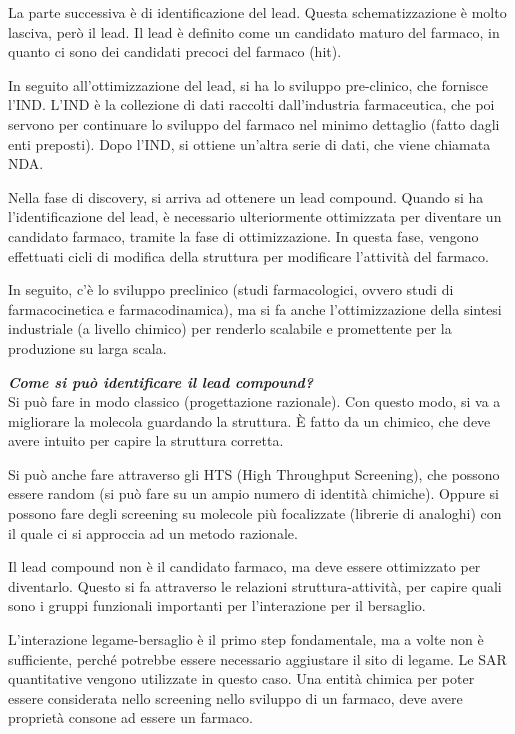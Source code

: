 La parte successiva è di identificazione del lead. Questa
schematizzazione è molto lasciva, però il lead.
Il lead è definito come un candidato maturo del farmaco, in quanto ci
sono dei candidati precoci del farmaco (hit).

In seguito all'ottimizzazione del lead, si ha lo sviluppo pre-clinico,
che fornisce l'IND. L'IND è la collezione di dati raccolti
dall'industria farmaceutica, che poi servono per continuare lo sviluppo
del farmaco nel minimo dettaglio (fatto dagli enti preposti).
Dopo l'IND, si ottiene un'altra serie di dati, che viene chiamata NDA.

Nella fase di discovery, si arriva ad ottenere un lead compound. Quando
si ha l'identificazione del lead, è necessario ulteriormente ottimizzata
per diventare un candidato farmaco, tramite la fase di ottimizzazione.
In questa fase, vengono effettuati cicli di modifica della struttura per
modificare l'attività del farmaco.

In seguito, c'è lo sviluppo preclinico (studi farmacologici, ovvero studi di
farmacocinetica e farmacodinamica), ma si fa anche
l'ottimizzazione della sintesi industriale (a livello chimico) per
renderlo scalabile e promettente per la produzione su larga scala.

{\color{Primary} \itshape{} \bfseries{} Come si può identificare il lead compound?}\\
Si può fare in modo classico (progettazione razionale). Con questo modo,
si va a migliorare la molecola guardando la struttura. È fatto da un
chimico, che deve avere intuito per capire la struttura corretta.

Si può anche fare attraverso gli HTS (High Throughput Screening), che
possono essere random (si può fare su un ampio numero di identità
chimiche).
Oppure si possono fare degli screening su molecole più focalizzate
(librerie di analoghi) con il quale ci si approccia ad un metodo
razionale.

Il lead compound non è il candidato farmaco, ma deve essere ottimizzato
per diventarlo.
Questo si fa attraverso le relazioni struttura-attività, per capire
quali sono i gruppi funzionali importanti per l'interazione per il
bersaglio.

L'interazione legame-bersaglio è il primo step fondamentale, ma a volte
non è sufficiente, perché potrebbe essere necessario aggiustare il sito
di legame. Le SAR quantitative vengono utilizzate in questo caso.
Una entità chimica per poter essere considerata nello screening nello
sviluppo di un farmaco, deve avere proprietà consone ad essere un
farmaco.

